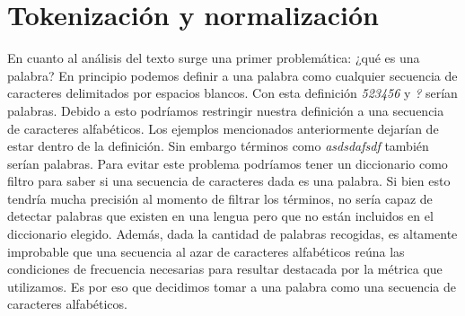 


\section{Tokenización y normalización}

En cuanto al análisis del texto surge una primer problemática: ¿qué es una palabra? En principio podemos definir a una palabra como cualquier secuencia de caracteres delimitados por espacios blancos. Con esta definición \textit{523456} y \textit{?} serían palabras. Debido a esto podríamos restringir nuestra definición a una secuencia de caracteres alfabéticos. Los ejemplos mencionados anteriormente dejarían de estar dentro de la definición. Sin embargo términos como \textit{asdsdafsdf} también serían palabras. Para evitar este problema podríamos tener un diccionario como filtro para saber si una secuencia de caracteres dada es una palabra. Si bien esto tendría mucha precisión al momento de filtrar los términos, no sería capaz de detectar palabras que existen en una lengua pero que no están incluidos en el diccionario elegido. Además, dada la cantidad de palabras recogidas, es altamente improbable que una secuencia al azar de caracteres alfabéticos reúna las condiciones de frecuencia necesarias para resultar destacada por la métrica que utilizamos. Es por eso que decidimos tomar a una palabra como una secuencia de caracteres alfabéticos.

